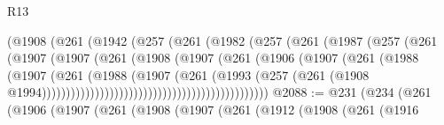 \begin{lexlean}{R13}
\begin{coremodule}
                                      (@1908
                                        (@261
                                          (@1942
                                            (@257
                                              (@261
                                                (@1982
                                                  (@257
                                                    (@261
                                                      (@1987
                                                        (@257
                                                          (@261
                                                            (@1907
                                                              (@1907
                                                                (@261
                                                                  (@1908
                                                                    (@1907
                                                                      (@261
                                                                        (@1906
                                                                          (@1907
                                                                            (@261
                                                                              (@1988
                                                                                (@1907
                                                                                  (@261
                                                                                    (@1988
                                                                                      (@1907
                                                                                        (@261
                                                                                          (@1993
                                                                                            (@257
                                                                                              (@261
                                                                                                (@1908
                                                                                                  @1994)))))))))))))))))))))))))))))))))))))))))))))))
@2088 := @231
    (@234
      (@261
        (@1906
          (@1907
            (@261
              (@1908
                (@1907
                  (@261
                    (@1912
                      (@1908
                        (@261
                          (@1916

\end{coremodule}
\end{lexlean}
